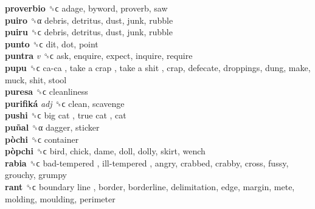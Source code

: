 \textbf{proverbio} ␝ϲ  adage, byword, proverb, saw  \\
\textbf{puiro} ␝α  debris, detritus, dust, junk, rubble  \\
\textbf{puiru} ␝ϲ  debris, detritus, dust, junk, rubble  \\
\textbf{punto} ␝ϲ  dit, dot, point  \\
\textbf{puntra} \emph{v}  ␝ϲ  ask, enquire, expect, inquire, require  \\
\textbf{pupu} ␝ϲ   ca-ca ,  take a crap ,  take a shit , crap, defecate, droppings, dung, make, muck, shit, stool  \\
\textbf{puresa} ␝ϲ  cleanliness  \\
\textbf{purifiká} \emph{adj}  ␝ϲ  clean, scavenge  \\
\textbf{pushi} ␝ϲ   big cat ,  true cat , cat  \\
\textbf{puñal} ␝α  dagger, sticker  \\
\textbf{pòchi} ␝ϲ  container  \\
\textbf{pòpchi} ␝ϲ  bird, chick, dame, doll, dolly, skirt, wench  \\
\textbf{rabia} ␝ϲ   bad-tempered ,  ill-tempered , angry, crabbed, crabby, cross, fussy, grouchy, grumpy  \\
\textbf{rant} ␝ϲ   boundary line , border, borderline, delimitation, edge, margin, mete, molding, moulding, perimeter  \\
